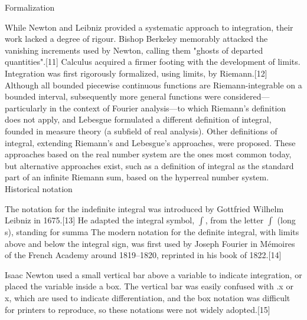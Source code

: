 \documentclass[twocolumn,a4paper,12pt]{article}
\begin{document}
Formalization

While Newton and Leibniz provided a systematic approach to integration, their work lacked a degree of rigour. Bishop Berkeley memorably attacked the vanishing increments used by Newton, calling them "ghosts of departed quantities".[11] Calculus acquired a firmer footing with the development of limits. Integration was first rigorously formalized, using limits, by Riemann.[12] Although all bounded piecewise continuous functions are Riemann-integrable on a bounded interval, subsequently more general functions were considered—particularly in the context of Fourier analysis—to which Riemann's definition does not apply, and Lebesgue formulated a different definition of integral, founded in measure theory (a subfield of real analysis). Other definitions of integral, extending Riemann's and Lebesgue's approaches, were proposed. These approaches based on the real number system are the ones most common today, but alternative approaches exist, such as a definition of integral as the standard part of an infinite Riemann sum, based on the hyperreal number system. 
Historical notation

The notation for the indefinite integral was introduced by Gottfried Wilhelm Leibniz in 1675.[13] He adapted the integral symbol, $\int$, from the letter $\int$ (long s), standing for summa  The modern notation for the definite integral, with limits above and below the integral sign, was first used by Joseph Fourier in Mémoires of the French Academy around 1819–1820, reprinted in his book of 1822.[14]

Isaac Newton used a small vertical bar above a variable to indicate integration, or placed the variable inside a box. The vertical bar was easily confused with .x or x, which are used to indicate differentiation, and the box notation was difficult for printers to reproduce, so these notations were not widely adopted.[15] 
\end{document}
